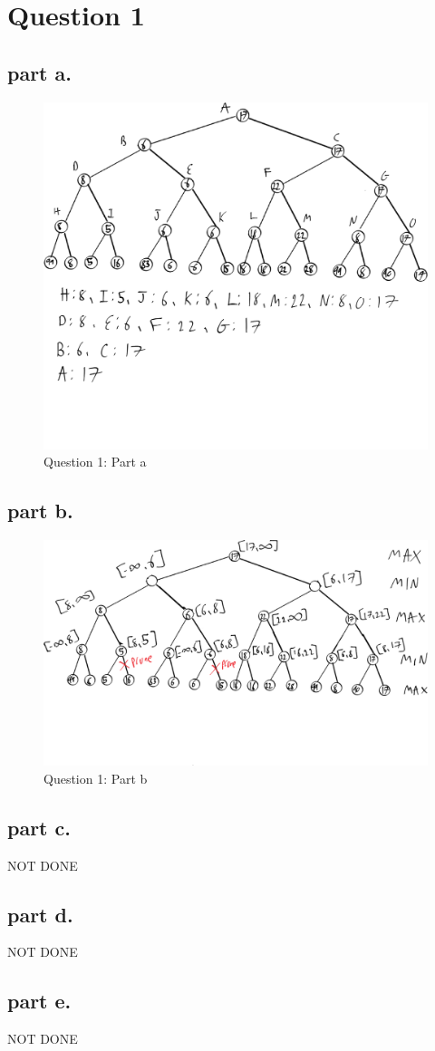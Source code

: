\section{Question 1}
\subsection{part a.}

\begin{figure}[H]
	\centering
  \includegraphics[scale = 0.70]{q1_part_a.png}
	\caption{Question 1: Part a}
	\label{fig: Q1 Part a}
\end{figure}


\subsection{part b.}

\begin{figure}[H]
	\centering
  \includegraphics[scale = 0.70]{q1_part_b.png}
	\caption{Question 1: Part b}
	\label{fig: Q1 Part b}
\end{figure}


\subsection{part c.}
NOT DONE

\subsection{part d.}
NOT DONE

\subsection{part e.}
NOT DONE
